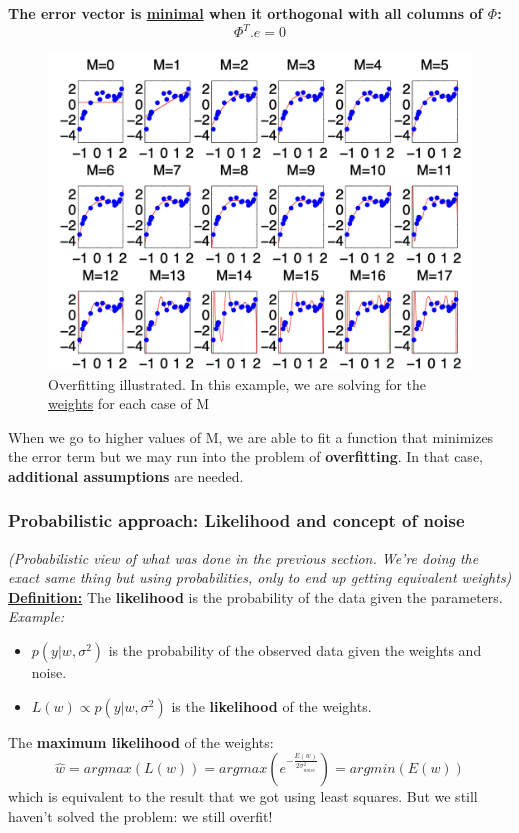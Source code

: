 \documentclass[a4paper,11pt]{article}
\begin{document}
\textbf{The error vector is \underline{minimal} when it orthogonal with all columns of $\Phi$:}
\[ \Phi^T.e = 0 \]
\begin{figure}[h]
	\centering
	\includegraphics[width=.8\linewidth]{figures/M.png}
	\caption{Overfitting illustrated. In this example, we are solving for the \underline{weights} for each case of M}
\end{figure}
When we go to higher values of M, we are able to fit a function that minimizes the error term but we may run into the problem of \textbf{overfitting}. In that case, \textbf{additional assumptions} are needed.
\subsubsection{Probabilistic approach: Likelihood and concept of noise}
\textit{(Probabilistic view of what was done in the previous section. We're doing the exact same thing but using probabilities, only to end up getting equivalent weights)}\vspace{5pt}\\
\underline{\textbf{Definition:}} The \textbf{likelihood} is the probability of the data given the parameters.\vspace{5pt}\\
\textit{Example:}
\begin{itemize}
	\item $p(y|w,\sigma^2)$ is the probability of the observed data given the weights and noise.
	\item $L(w) \propto p(y|w,\sigma^2)$ is the \textbf{likelihood} of the weights.
\end{itemize}
The \textbf{maximum likelihood} of the weights:
\[ \hat{w} = argmax(L(w)) = argmax(e^{-\frac{E(w)}{2 \sigma_{noise}^2}}) = argmin(E(w)) \]
which is equivalent to the result that we got using least squares. But we still haven't solved the problem: we still overfit!
\end{document}
